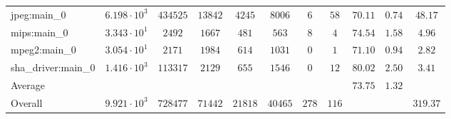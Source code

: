 \begin{tabular}{|l|c|c|c|c|c|c|c|c|c|c|}
jpeg:main\_0            & $ 6.198 \cdot 10^{3} $ & $ 434525 $ & $ 13842 $ & $ 4245  $ & $ 8006  $ & $ 6   $ & $ 58  $ & $ 70.11       $ & $ 0.74    $ & $ 48.17   $ \\
mips:main\_0            & $ 3.343 \cdot 10^{1} $ & $ 2492   $ & $ 1667  $ & $ 481   $ & $ 563   $ & $ 8   $ & $ 4   $ & $ 74.54       $ & $ 1.58    $ & $ 4.96    $ \\
mpeg2:main\_0           & $ 3.054 \cdot 10^{1} $ & $ 2171   $ & $ 1984  $ & $ 614   $ & $ 1031  $ & $ 0   $ & $ 1   $ & $ 71.10       $ & $ 0.94    $ & $ 2.82    $ \\
sha\_driver:main\_0     & $ 1.416 \cdot 10^{3} $ & $ 113317 $ & $ 2129  $ & $ 655   $ & $ 1546  $ & $ 0   $ & $ 12  $ & $ 80.02       $ & $ 2.50    $ & $ 3.41    $ \\
\hline
Average                 & $                    $ & $        $ & $       $ & $       $ & $       $ & $     $ & $     $ & $ 73.75       $ & $ 1.32    $ & $         $ \\
\hline
Overall                 & $ 9.921 \cdot 10^{3} $ & $ 728477 $ & $ 71442 $ & $ 21818 $ & $ 40465 $ & $ 278 $ & $ 116 $ & $             $ & $         $ & $ 319.37  $ \\
\hline
\end{tabular}
